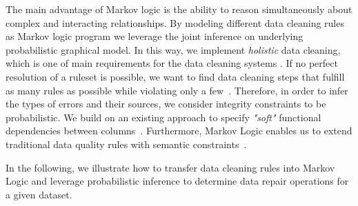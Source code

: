 The main advantage of Markov logic is the ability to reason simultaneously about complex and interacting relationships. By modeling different data cleaning rules as Markov logic program we leverage the joint inference on underlying probabilistic graphical model. In this way, we implement \textit{holistic} data cleaning, which is one of main requirements for the data cleaning systems \cite{fan2013data, Fan:2014:IRM:2628135.2567657, Dallachiesa:2013:NCD:2463676.2465327}. If no perfect resolution of a ruleset is possible, we want to find data cleaning steps that fulfill as many rules as possible while violating only a few~\cite{genesereth1987logical, domingos2009markov}. Therefore, in order to infer the types of errors and their sources, we consider integrity constraints to be probabilistic. We build on an existing approach to specify \textit{"soft"} functional dependencies between columns~\cite{Ilyas:2004:CAD:1007568.1007641}. 
Furthermore, Markov Logic enables us to extend traditional data quality rules with semantic constraints~\cite{spies2013knowledge}. 

In the following, we illustrate how to transfer data cleaning rules into Markov Logic and leverage probabilistic inference to determine data repair operations for a given dataset.  


